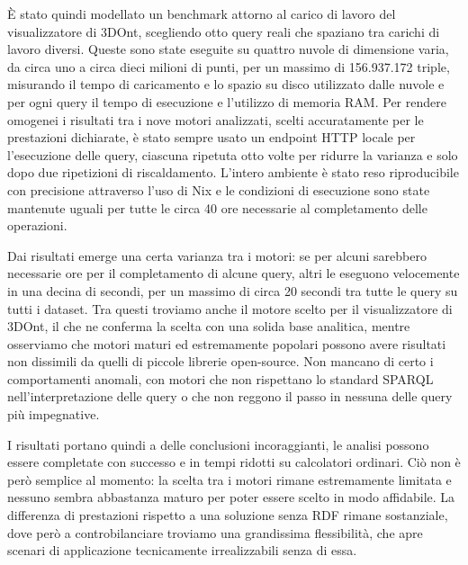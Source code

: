\par È stato quindi modellato un benchmark attorno al carico di lavoro del
visualizzatore di 3DOnt, scegliendo otto query reali che spaziano tra carichi di lavoro
diversi. Queste sono state eseguite su quattro nuvole di dimensione varia, da
circa uno a circa dieci milioni di punti, per un massimo di 156.937.172 triple, 
misurando il tempo di caricamento e lo spazio su disco utilizzato dalle nuvole
e per ogni query il tempo di esecuzione e l'utilizzo di memoria RAM.
Per rendere omogenei i risultati tra i nove motori analizzati, scelti accuratamente per
le prestazioni dichiarate, è stato sempre usato
un endpoint HTTP locale per l'esecuzione delle query, ciascuna ripetuta otto volte
per ridurre la varianza e solo dopo due ripetizioni di riscaldamento.
L'intero ambiente è stato reso riproducibile con precisione attraverso l'uso di Nix
e le condizioni di esecuzione sono state mantenute uguali per tutte le circa 40 ore
necessarie al completamento delle operazioni.

\par Dai risultati emerge una certa varianza tra i motori: se per alcuni sarebbero necessarie
ore per il completamento di alcune query, altri le eseguono velocemente in una decina di secondi,
per un massimo di circa 20 secondi tra tutte le query su tutti i dataset. 
Tra questi troviamo anche il motore scelto per il visualizzatore di 3DOnt, il che ne conferma
la scelta con una solida base analitica, mentre osserviamo che motori maturi ed estremamente popolari
possono avere risultati non dissimili da quelli di piccole librerie open-source. 
Non mancano di certo i comportamenti anomali, con motori che non rispettano lo standard SPARQL
nell'interpretazione delle query o che non reggono il passo in nessuna delle query più impegnative.

\par I risultati portano quindi a delle conclusioni incoraggianti, le analisi
possono essere completate con successo e in tempi ridotti su calcolatori ordinari. 
Ciò non è però semplice al momento: la scelta tra i motori rimane estremamente limitata
e nessuno sembra abbastanza maturo per poter essere scelto in modo affidabile.
La differenza di prestazioni rispetto a una soluzione senza RDF rimane sostanziale,
dove però a controbilanciare troviamo una grandissima flessibilità, che apre scenari
di applicazione tecnicamente irrealizzabili senza di essa.
